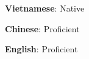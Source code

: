 \resumeSubHeadingListStart
  \small{
  \item{\textbf{Vietnamese}{: Native}}
  \vspace{-8pt}
  \item{\textbf{Chinese}{: Proficient}}
  \vspace{-8pt}
  \item{\textbf{English}{: Proficient}}
  }
\resumeSubHeadingListEnd

